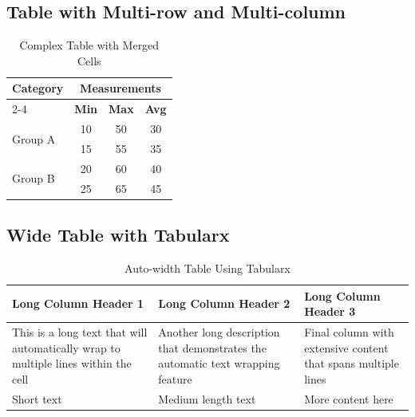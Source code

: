 \documentclass[a4paper,12pt]{article}
\begin{document}
\subsection{Table with Multi-row and Multi-column}
\begin{table}[H]
\centering
\caption{Complex Table with Merged Cells}
\label{tab:complex}
\begin{tabular}{|l|c|c|c|}
\hline
\rowcolor{secondary!30}
\textbf{Category} & \multicolumn{3}{c|}{\textbf{Measurements}} \\
\cline{2-4}
\rowcolor{secondary!30}
& \textbf{Min} & \textbf{Max} & \textbf{Avg} \\
\hline
\multirow{2}{*}{Group A} & 10 & 50 & 30 \\
\cline{2-4}
& 15 & 55 & 35 \\
\hline
\multirow{2}{*}{Group B} & 20 & 60 & 40 \\
\cline{2-4}
& 25 & 65 & 45 \\
\hline
\end{tabular}
\end{table}

\subsection{Wide Table with Tabularx}
\begin{table}[H]
\centering
\caption{Auto-width Table Using Tabularx}
\label{tab:wide}
\begin{tabularx}{\textwidth}{|X|X|X|}
\hline
\rowcolor{accent!20}
\textbf{Long Column Header 1} & \textbf{Long Column Header 2} & \textbf{Long Column Header 3} \\
\hline
This is a long text that will automatically wrap to multiple lines within the cell & 
Another long description that demonstrates the automatic text wrapping feature & 
Final column with extensive content that spans multiple lines \\
\hline
Short text & Medium length text & More content here \\
\hline
\end{tabularx}
\end{table}
\end{document}
